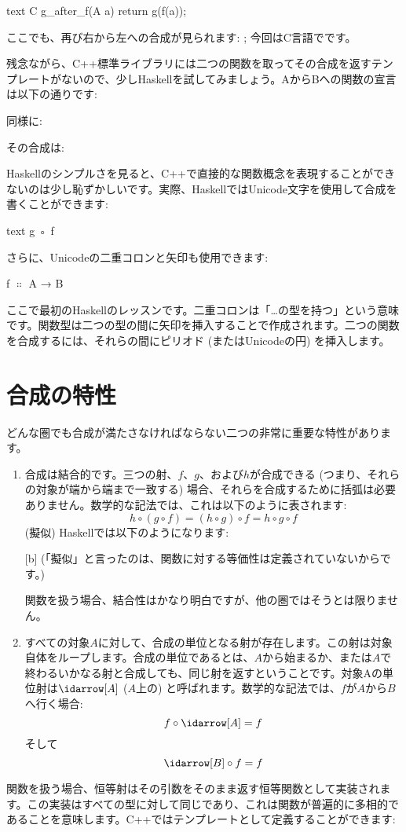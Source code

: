 \begin{snip}{text}
C g_after_f(A a)
{
    return g(f(a));
}
\end{snip}
ここでも、再び右から左への合成が見られます: ; 今回はC言語でです。

残念ながら、C++標準ライブラリには二つの関数を取ってその合成を返すテンプレートがないので、少しHaskellを試してみましょう。AからBへの関数の宣言は以下の通りです:

同様に:

その合成は:

Haskellのシンプルさを見ると、C++で直接的な関数概念を表現することができないのは少し恥ずかしいです。実際、HaskellではUnicode文字を使用して合成を書くことができます:
\begin{snip}{text}
g ◦ f
\end{snip}

さらに、Unicodeの二重コロンと矢印も使用できます:
\begin{snipv}
f \ensuremath{\Colon} A → B
\end{snipv}
ここで最初のHaskellのレッスンです。二重コロンは「\ldots{}の型を持つ」という意味です。関数型は二つの型の間に矢印を挿入することで作成されます。二つの関数を合成するには、それらの間にピリオド (またはUnicodeの円) を挿入します。

\section{合成の特性}

どんな圏でも合成が満たさなければならない二つの非常に重要な特性があります。

\begin{enumerate}
  \item
        合成は結合的です。三つの射、$f$、$g$、および$h$が合成できる (つまり、それらの対象が端から端まで一致する) 場合、それらを合成するために括弧は必要ありません。数学的な記法では、これは以下のように表されます:
        \[h \circ (g \circ f) = (h \circ g) \circ f = h \circ g \circ f\]
        (擬似) Haskellでは以下のようになります:

        [b]
        (「擬似」と言ったのは、関数に対する等価性は定義されていないからです。)

        関数を扱う場合、結合性はかなり明白ですが、他の圏ではそうとは限りません。

  \item
        すべての対象$A$に対して、合成の単位となる射が存在します。この射は対象自体をループします。合成の単位であるとは、$A$から始まるか、または$A$で終わるいかなる射と合成しても、同じ射を返すということです。対象Aの単位射は$\idarrow[A]$ ($A$上の) と呼ばれます。数学的な記法では、$f$が$A$から$B$へ行く場合:
        \[f \circ \idarrow[A] = f\]
        そして
        \[\idarrow[B] \circ f = f\]
\end{enumerate}
関数を扱う場合、恒等射はその引数をそのまま返す恒等関数として実装されます。この実装はすべての型に対して同じであり、これは関数が普遍的に多相的であることを意味します。C++ではテンプレートとして定義することができます:

